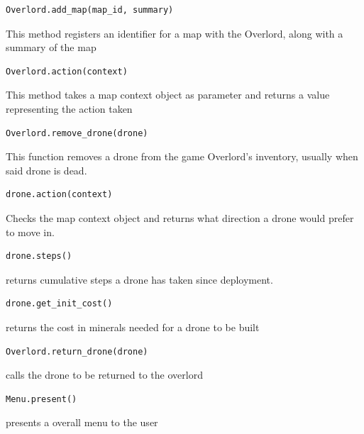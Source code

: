 \documentclass[12pt]{article}
\begin{document}
\begin{lstlisting}[basicstyle=\large]
Overlord.add_map(map_id, summary)
\end{lstlisting}
\large{This method registers an identifier for a map with the Overlord, along with a summary of the map}\\
\begin{lstlisting}[basicstyle=\large]
Overlord.action(context)
\end{lstlisting}
\large{This method takes a map context object as parameter and returns a value representing the action taken}\\
\newpage
\begin{lstlisting}[basicstyle=\large]
Overlord.remove_drone(drone)
\end{lstlisting}
\large{This function removes a drone from the game Overlord's inventory, usually when said drone is dead.}\\

\begin{lstlisting}[basicstyle=\large]
drone.action(context)
\end{lstlisting}
\large{Checks the map context object and returns what direction a drone would prefer to move in.}\\

\begin{lstlisting}[basicstyle=\large]
drone.steps()
\end{lstlisting}
\large{returns cumulative steps a drone has taken since deployment.}\\

\begin{lstlisting}[basicstyle=\large]
drone.get_init_cost()
\end{lstlisting}
\large{returns the cost in minerals needed for a drone to be built}\\

\begin{lstlisting}[basicstyle=\large]
Overlord.return_drone(drone)
\end{lstlisting}
\large{calls the drone to be returned to the overlord}\\

\begin{lstlisting}[basicstyle=\large]
Menu.present()
\end{lstlisting}
\large{presents a overall menu to the user}\\
\end{document}
